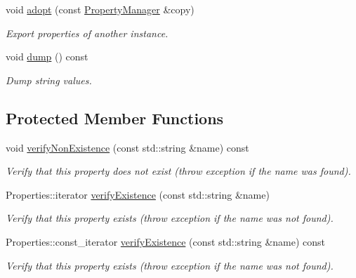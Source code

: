 \begin{DoxyCompactItemize}
void \hyperlink{class_d_d4hep_1_1_property_manager_aaf21d1b86b833d99d004a77db1872141}{adopt} (const \hyperlink{class_d_d4hep_1_1_property_manager}{PropertyManager} \&copy)
\begin{DoxyCompactList}\small\item\em Export properties of another instance. \item\end{DoxyCompactList}\item 
void \hyperlink{class_d_d4hep_1_1_property_manager_a21f6decfbdbca30f65fa4ebae6da5468}{dump} () const 
\begin{DoxyCompactList}\small\item\em Dump string values. \item\end{DoxyCompactList}\end{DoxyCompactItemize}
\subsection*{Protected Member Functions}
\begin{DoxyCompactItemize}
\item 
void \hyperlink{class_d_d4hep_1_1_property_manager_a2175a64911355eb33720acbac096a789}{verifyNonExistence} (const std::string \&name) const 
\begin{DoxyCompactList}\small\item\em Verify that this property does not exist (throw exception if the name was found). \item\end{DoxyCompactList}\item 
Properties::iterator \hyperlink{class_d_d4hep_1_1_property_manager_a6c6a752bab81f32aeac935aa75270bbb}{verifyExistence} (const std::string \&name)
\begin{DoxyCompactList}\small\item\em Verify that this property exists (throw exception if the name was not found). \item\end{DoxyCompactList}\item 
Properties::const\_\-iterator \hyperlink{class_d_d4hep_1_1_property_manager_a47a4cd2669b54050491dc52ea688212c}{verifyExistence} (const std::string \&name) const 
\begin{DoxyCompactList}\small\item\em Verify that this property exists (throw exception if the name was not found). \item\end{DoxyCompactList}\end{DoxyCompactItemize}
